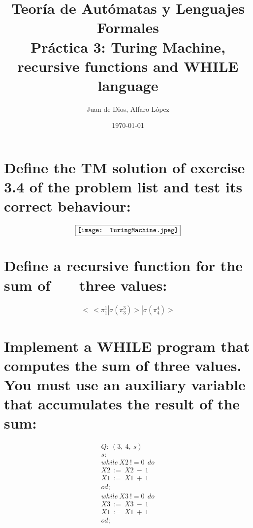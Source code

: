 \documentclass[fleqn, 10pt]{article}
\title{Teoría de Autómatas y Lenguajes Formales\\[.4\baselineskip]Práctica 3: Turing Machine, recursive functions and WHILE language}
\author{Juan de Dios, Alfaro López}
\date{\today}
\theoremstyle{plain}
\theoremstyle{definition}
\begin{document}
\maketitle

\section{Define the TM solution of exercise 3.4 of the problem list and test its correct behaviour:}

\begin{ceqn}	%
    \begin{align*} %
    \fbox{\texttt{[image: TuringMachine.jpeg]}}
    \end{align*} 
  \end{ceqn}




\section{Define a recursive function for the sum of \ \ \ three values:}

 

\begin{ceqn}	%
    \begin{align*} %
    <\ <\pi_1^1|\sigma(\pi_3^3)>|\sigma(\pi_4^4)>
	\end{align*} 
\end{ceqn}

\section{Implement a WHILE program that computes the sum of three values. You must use an auxiliary variable that accumulates the result of the sum:} 

\begin{ceqn}	%
    \begin{align*} %
    Q: \ (3,\ 4, \ s) \ \ \ \ \ \ \ \ \\
    s: \ \ \ \ \ \ \ \ \ \ \ \  \ \ \ \ \ \ \ \ \ \ \\
    while \ X2\ != 0\  \ do \\
    X2\ := \ X2 \ - \ 1 \\
    X1\ := \ X1 \ + \ 1 \\
    od; \ \ \ \ \ \ \ \ \ \ \ \ \ \ \ \ \ \ \ \ \  \\
    while \ X3\ != 0\  \ do \\
    X3\ := \ X3 \ - \ 1 \\
    X1\ := \ X1 \ + \ 1 \\
    od; \ \ \ \ \ \ \ \ \ \ \ \ \ \ \ \ \ \ \ \ \  \\
	\end{align*} 
\end{ceqn}
\end{document}
